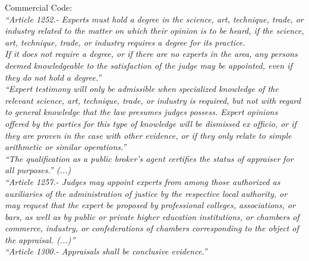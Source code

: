 

\textcolor{principal}{Commercial Code:}\\[10pt]

\textit{``Article 1252.- Experts must hold a degree in the science, art, technique, trade, or industry related to the matter on which their opinion is to be heard, if the science, art, technique, trade, or industry requires a degree for its practice.}\\[10pt]

\textit{ If it does not require a degree, or if there are no experts in the area, any persons deemed knowledgeable to the satisfaction of the judge may be appointed, even if they do not hold a degree.''} \\[10pt]

\textit{``Expert testimony will only be admissible when specialized knowledge of the relevant science, art, technique, trade, or industry is required, but not with regard to general knowledge that the law presumes judges possess. Expert opinions offered by the parties for this type of knowledge will be dismissed ex officio, or if they are proven in the case with other evidence, or if they only relate to simple arithmetic or similar operations.''} \\[10pt]

\textit{``The qualification as a public broker's agent certifies the status of appraiser for all purposes.'' (...)}\\[10pt]

\textit{``Article 1257.- Judges may appoint experts from among those authorized as auxiliaries of the administration of justice by the respective local authority, or may request that the expert be proposed by professional colleges, associations, or bars, as well as by public or private higher education institutions, or chambers of commerce, industry, or confederations of chambers corresponding to the object of the appraisal. (...)''}\\[10pt]

\textit{``Article 1300.- Appraisals shall be conclusive evidence.''}\\[10pt]


